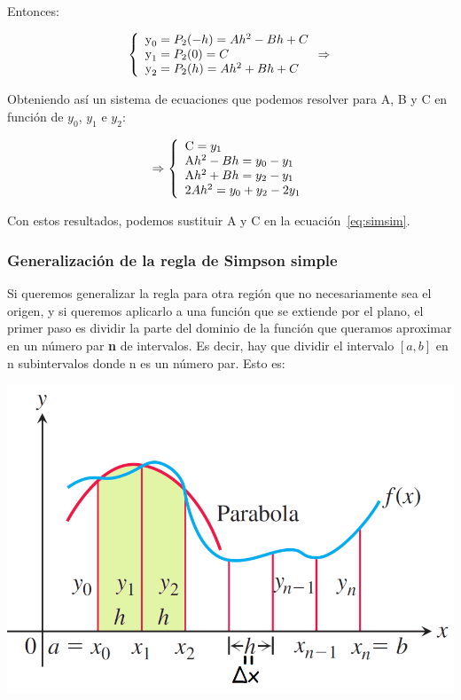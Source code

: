 \documentclass{article}
\begin{document}
			Entonces:
			
			\begin{equation*}
				\left\lbrace
				\begin{array}{ll}
					\textup y_0 = P_2(-h) = Ah^2-Bh+C\\
					\textup y_1 = P_2(0) = C\\
					\textup y_2 = P_2(h) = Ah^2+Bh+C\\
				\end{array}
				\Rightarrow\right.
			\end{equation*}
			
			Obteniendo así un sistema de ecuaciones que podemos resolver para A, B y C en función de $y_0$, $y_1$ e $y_2$:
			
			\begin{equation}
				\Rightarrow
				\left\lbrace
				\begin{array}{ll}
					\textup C = y_1\\
					\textup Ah^2-Bh = y_0 - y_1\\
					\textup Ah^2+Bh = y_2 - y_1\\
					\textup 2Ah^2 = y_0 + y_2 - 2y_1\\
				\end{array}
				\right.
			\end{equation}
			
			Con estos resultados, podemos sustituir A y C en la ecuación~\ref{eq:simsim}.
			
		\subsubsection{Generalización de la regla de Simpson simple}
		
		Si queremos generalizar la regla para otra región que no necesariamente sea el origen, y si queremos aplicarlo a una función que se extiende por el plano, el primer paso es dividir la parte del dominio de la función que queramos aproximar en un número par \textbf{n} de intervalos. Es decir, hay que dividir el intervalo $[a,b]$ en n subintervalos donde n es un número par. Esto es:
		
		\begin{center}
			\includegraphics[scale=0.5]{simple_n}
		\end{center}
		
\end{document}
